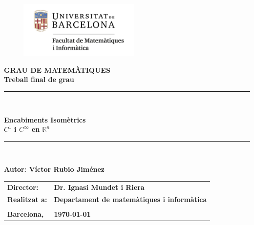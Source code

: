 \documentclass[11pt,a4paper,openright,oneside]{book}
\numberwithin{equation}{section}
\theoremstyle{definition}
\begin{document}
\thispagestyle{empty}

\begin{titlepage}
\begin{center}
\begin{figure}[htb]
\begin{center}
\includegraphics[width=6cm]{matematiquesinformatica-pos-rgb.png}
\end{center}
\end{figure}

\vspace*{1cm}
\textbf{\LARGE GRAU DE MATEM\`{A}TIQUES } \\
\vspace*{.5cm}
\textbf{\LARGE Treball final de grau} \\

\vspace*{1.5cm}
\rule{16cm}{0.1mm}\\
\begin{Huge}
\textbf{Encabiments Isomètrics\\ $C^1$ i $C^\infty$ en $\mathbb R^n$} \\
\end{Huge}
\rule{16cm}{0.1mm}\\

\vspace{1cm}

\begin{flushright}
\textbf{\LARGE Autor: Víctor Rubio Jiménez}

\vspace*{2cm}

\renewcommand{\arraystretch}{1.5}
\begin{tabular}{ll}
\textbf{\Large Director:} & \textbf{\Large Dr. Ignasi Mundet i Riera } \\
\textbf{\Large Realitzat a:} & \textbf{\Large  Departament de matemàtiques i informàtica   } \\
\\
\textbf{\Large Barcelona,} & \textbf{\Large \today }
\end{tabular}
\end{flushright}
\end{center}
\end{titlepage}
\end{document}
